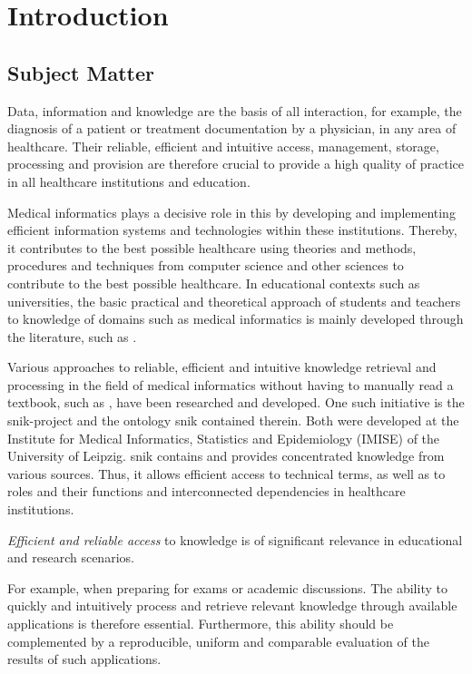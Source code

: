 \chapter{Introduction}\label{ch:introduction}
\section{Subject Matter}\label{sec:subject matter}
Data, information and knowledge are the basis of all interaction, for example, the diagnosis of a patient or treatment documentation by a physician, in any area of healthcare.
Their reliable, efficient and intuitive access, management, storage, processing and provision are therefore crucial to provide a high quality of practice in all healthcare institutions and education.
%

%
Medical informatics plays a decisive role in this by developing and implementing efficient information systems and technologies within these institutions.
Thereby, it contributes to the best possible healthcare using theories and methods, procedures and techniques from computer science and other sciences to contribute to the best possible healthcare.
%
In educational contexts such as universities, the basic practical and theoretical approach of students and teachers to knowledge of domains such as medical informatics is mainly developed through the literature, such as \citet{bb2}.
%

%
Various approaches to reliable, efficient and intuitive knowledge retrieval and processing in the field of medical informatics without having to manually read a textbook, such as \citet{bb2}, have been researched and developed.
%
One such initiative is the \ac{snik}-project and the ontology \ac{snik} contained therein.
Both were developed at the Institute for Medical Informatics, Statistics and Epidemiology (IMISE) of the University of Leipzig.
\ac{snik} contains and provides concentrated knowledge from various sources.
Thus, it allows efficient access to technical terms, as well as to roles and their functions and interconnected dependencies in healthcare institutions.
%

\textit{Efficient and reliable access} to knowledge is of significant relevance in educational and research scenarios.

For example, when preparing for exams or academic discussions.
The ability to quickly and intuitively process and retrieve relevant knowledge through available applications is therefore essential.
Furthermore, this ability should be complemented by a reproducible, uniform and comparable evaluation of the results of such applications.
%

